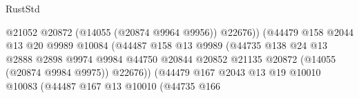 \begin{lexlean}{RustStd}
\begin{coremodule}
                                                      @21052
                                                      @20872
                                                      (@14055 (@20874 @9964 @9956))
                                                      @22676))
                                                  (@44479
                                                    @158
                                                    @2044
                                                    @13
                                                    @20
                                                    @9989
                                                    @10084
                                                    (@44487
                                                      @158
                                                      @13
                                                      @9989
                                                      (@44735
                                                        @138
                                                        @24
                                                        @13
                                                        @2888
                                                        @2898
                                                        @9974
                                                        @9984
                                                        @44750
                                                        @20844
                                                        @20852
                                                        @21135
                                                        @20872
                                                        (@14055 (@20874 @9984 @9975))
                                                        @22676))
                                                    (@44479
                                                      @167
                                                      @2043
                                                      @13
                                                      @19
                                                      @10010
                                                      @10083
                                                      (@44487
                                                        @167
                                                        @13
                                                        @10010
                                                        (@44735
                                                          @166

\end{coremodule}
\end{lexlean}
